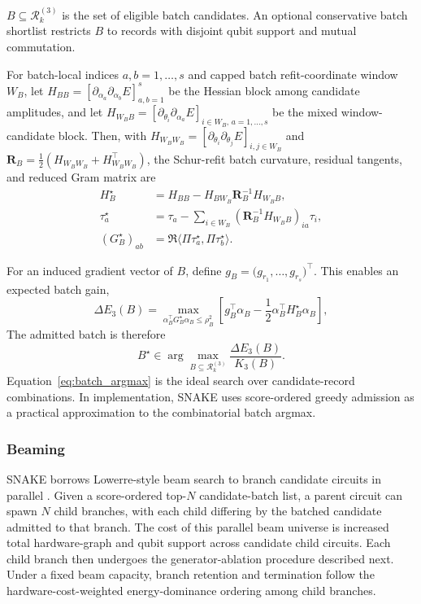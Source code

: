 \documentclass[
  reprint,
  amsmath,
  amssymb,
  aps,
  pra,
  nofootinbib,
  superscriptaddress,
  floatfix
]{revtex4-2}
\begin{document}
$B\subseteq\mathcal R_k^{(3)}$ is the set of eligible batch candidates.  An optional conservative batch shortlist restricts \(B\) to records with disjoint qubit support and mutual commutation.

For batch-local indices \(a,b=1,\ldots,s\) and capped batch refit-coordinate window \(W_B\), let $H_{BB}=[\partial_{\alpha_a}\partial_{\alpha_b}E]_{a,b=1}^s$ be the Hessian block among candidate amplitudes, and let $H_{W_BB}=[\partial_{\theta_i}\partial_{\alpha_a}E]_{i\in W_B,\,a=1,\ldots,s}$ be the mixed window-candidate block. Then, with $H_{W_BW_B}=[\partial_{\theta_i}\partial_{\theta_j}E]_{i,j\in W_B}$ and $\mathbf R_B=\frac12(H_{W_BW_B}+H_{W_BW_B}^{\top})$, the Schur-refit batch curvature, residual tangents, and reduced Gram matrix are
\begin{equation}
\begin{aligned}
H_B^\star
&=
H_{BB}
-
H_{BW_B}\mathbf R_B^{-1}H_{W_BB},\\
\tau_a^\star
&=\tau_a-\sum_{i\in W_B}(\mathbf R_B^{-1}H_{W_BB})_{ia}\tau_i,\\
(G_B^\star)_{ab}
&=\Re\langle \Pi\tau_a^\star,\Pi\tau_b^\star\rangle .
\end{aligned}
\label{eq:batch_schur_curvature}
\end{equation}

For an induced gradient vector of $B$, define \(g_B=\big(g_{r_1},\ldots,g_{r_s}\big)^\top\). This enables an expected batch gain,
\begin{equation}
\Delta E_3(B)
=
\max_{\alpha_B^\top G_B^\star\alpha_B\le \rho_B^2}
\left[
g_B^\top\alpha_B
-
\frac12\alpha_B^\top H_B^\star\alpha_B
\right],
\label{eq:batch_expected_gain}
\end{equation}
The admitted batch is therefore
\begin{equation}
B^\star\in\arg\max_{B\subseteq\mathcal R_k^{(3)}}\frac{\Delta E_3(B)}{K_3(B)}.
\label{eq:batch_argmax}
\end{equation}
Equation~\eqref{eq:batch_argmax} is the ideal search over candidate-record
combinations. In implementation, SNAKE uses score-ordered greedy admission as a
practical approximation to the combinatorial batch argmax.

\subsubsection{Beaming}
SNAKE borrows Lowerre-style beam search to branch candidate circuits in parallel \cite{Lowerre1976Beam}.  Given a score-ordered top-\(N\) candidate-batch list, a parent circuit can spawn \(N\) child branches, with each child differing by the batched candidate admitted to that branch.  The cost of this parallel beam universe is increased total hardware-graph and qubit support across candidate child circuits.  Each child branch then undergoes the generator-ablation procedure described next.  Under a fixed beam capacity, branch retention and termination follow the hardware-cost-weighted energy-dominance ordering among child branches.
\end{document}
